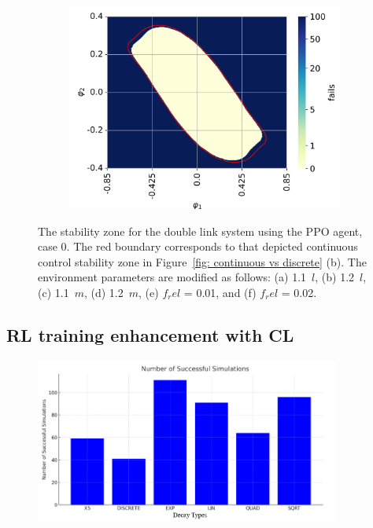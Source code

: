 \begin{figure}[h!]
\begin{subfigure}[t]{0.32\textwidth}
         \includegraphics[width=\textwidth]{Figures/DP_friction_0.02.png}
         \label{fig: DP friction 0.02}
         \caption{}
     \end{subfigure}

     \caption{The stability zone for the double link system using the PPO agent, case 0. The red boundary corresponds to that depicted continuous control stability zone in Figure~\ref{fig: continuous vs discrete} (b). The environment parameters are modified as follows: (a) 1.1~$l$, (b) 1.2~$l$, (c) 1.1~$m$, (d) 1.2~$m$, (e) $f_rel$ = 0.01, and (f) $f_rel$ = 0.02.}
     \label{fig: agent impact on different environments}
 \end{figure}



\subsection{RL training enhancement with CL} \label{subsec: RL training enhancement with CL}

\begin{figure}[h]
	\centering
	\includegraphics[width=10cm]{Figures/decay_types_results_comparison.png}
	\caption{}
	\label{fig: decay types comparison}
\end{figure}

